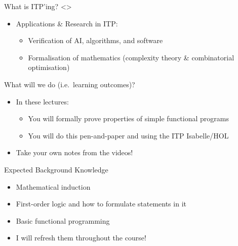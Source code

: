 \documentclass[compress,10pt,xcolor=dvipsnames]{beamer}
\begin{document}
\begin{frame}{What is ITP'ing?}
\only<\formalproofmywork>{
\begin{itemize}
  \item Applications \& Research in ITP:
  \begin{itemize}
    \item Verification of AI, algorithms, and software
    \item Formalisation of mathematics (complexity theory \& combinatorial optimisation)
  \end{itemize}
\end{itemize}
}
\end{frame}

\begin{frame}{What will we do (i.e.\ learning outcomes)?}

\begin{itemize}
\item In these lectures:
  \begin{itemize}
    \item You will formally prove properties of simple functional programs
    \item You will do this pen-and-paper and using the ITP Isabelle/HOL
  \end{itemize}
\item Take your own notes from the videos!
\end{itemize}
\end{frame}

\begin{frame}{Expected Background Knowledge}
\begin{itemize}
  \item Mathematical induction
  \item First-order logic and how to formulate statements in it
  \item Basic functional programming
  \item I will refresh them throughout the course!
\end{itemize}
\end{frame}
\end{document}
